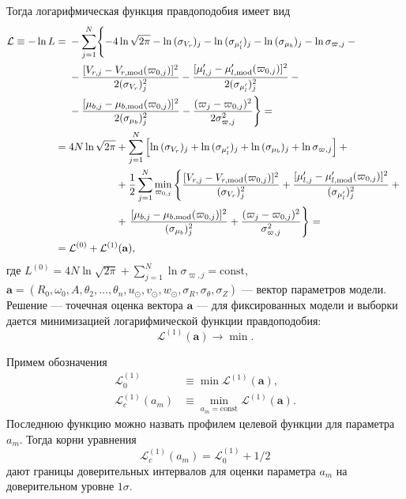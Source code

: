 \documentclass[a4paper, oneside, 14pt]{article}
\begin{document}
Тогда логарифмическая функция правдоподобия имеет вид
%
\begin{align}
  \label{eq:L}\nonumber
  \mathcal{L} \equiv -\ln{L} &=
  \begin{aligned}[t]
    &-\sum_{j=1}^N \Biggl\{ -4 \ln{\sqrt{2 \pi}} - \ln{(\sigma_{V_r})_j} - \ln{(\sigma_{\mu_l'})_j} - \ln{(\sigma_{\mu_b})_j} - \ln{\sigma_{\varpi,j}} - {}\\
    &-\frac{[ V_{r,j} - V_{r,\text{mod}}(\varpi_{0,j}) ]^2}{2 (\sigma_{V_r})_j^2} - \frac{[ \mu_{l,j}' - \mu_{l,\text{mod}}'(\varpi_{0,j}) ]^2}{2 (\sigma_{\mu_l'})_j^2} - {}\\
    &-\frac{[ \mu_{b,j} - \mu_{b,\text{mod}}(\varpi_{0,j}) ]^2}{2 (\sigma_{\mu_b})_j^2} - \frac{( \varpi_j - \varpi_{0,j} )^2}{2 \sigma_{\varpi,j}^2} \Biggr\} = {}
  \end{aligned}\\
  \nonumber
  &= 4 N \ln{\sqrt{2 \pi}}
  \begin{aligned}[t]
    &+ \sum_{j=1}^N \left[ \ln{(\sigma_{V_r})_j} + \ln{(\sigma_{\mu_l'})_j} + \ln{(\sigma_{\mu_b})_j} + \ln{\sigma_{\varpi,j}} \right] + {}\\
    &+ \frac{1}{2} \sum_{j=1}^N \min_{\varpi_{0,j}} \left\{ \frac{[ V_{r,j} - V_{r,\text{mod}}(\varpi_{0,j}) ]^2}{(\sigma_{V_r})_j^2} + \frac{[ \mu_{l,j}' - \mu_{l,\text{mod}}'(\varpi_{0,j}) ]^2}{(\sigma_{\mu_l'})_j^2} + {} \right.\\
    &+ \left. \frac{[ \mu_{b,j} - \mu_{b,\text{mod}}(\varpi_{0,j}) ]^2}{(\sigma_{\mu_b})_j^2} + \frac{( \varpi_j - \varpi_{0,j} )^2}{\sigma_{\varpi,j}^2} \vphantom{\frac{[ \mu_{l,j}' - \mu_{l,\text{mod}}'(\varpi_{0,j}) ]^2}{(\sigma_{\mu_l'})_j^2}} \right\} = {}
  \end{aligned}\\
  &= \mathcal{L}^{(0)} + \mathcal{L}^{(1)}(\mathbf{a}),
\end{align}
%
где $ L^{(0)} = 4 N \ln{\sqrt{2 \pi}} + \sum_{j=1}^N \ln{\sigma_{\varpi,j}} = \text{const} $, $ \mathbf{a} = (R_0, \omega_0, A, \theta_2, \ldots, \theta_n, u_\odot, v_\odot, w_\odot, \sigma_R, \sigma_\theta, \sigma_Z) $ --- вектор параметров модели. Решение --- точечная оценка вектора $ \mathbf{a} $ --- для фиксированных модели и выборки дается минимизацией логарифмической функции правдоподобия:
%
\begin{equation}
  \label{eq:L_1}
  \mathcal{L}^{(1)}(\mathbf{a}) \rightarrow \min.
\end{equation}

Примем обозначения
%
\begin{align}
  \mathcal{L}_0^{(1)} &\equiv \min{\mathcal{L}^{(1)}(\mathbf{a})},\\
  \label{eq:L_c}
  \mathcal{L}_c^{(1)}(a_m) &\equiv \min_{a_m = \text{const}}{\mathcal{L}^{(1)}(\mathbf{a})}.
\end{align}
%
Последнюю функцию можно назвать профилем целевой функции для параметра $ a_m $. Тогда корни уравнения
%
\begin{equation}
  \label{eq:L_c_roots}
  \mathcal{L}_c^{(1)}(a_m) = \mathcal{L}_0^{(1)} + 1 / 2
\end{equation}
%
дают границы доверительных интервалов для оценки параметра $ a_m $ на доверительном уровне $ 1 \sigma $.
\end{document}
